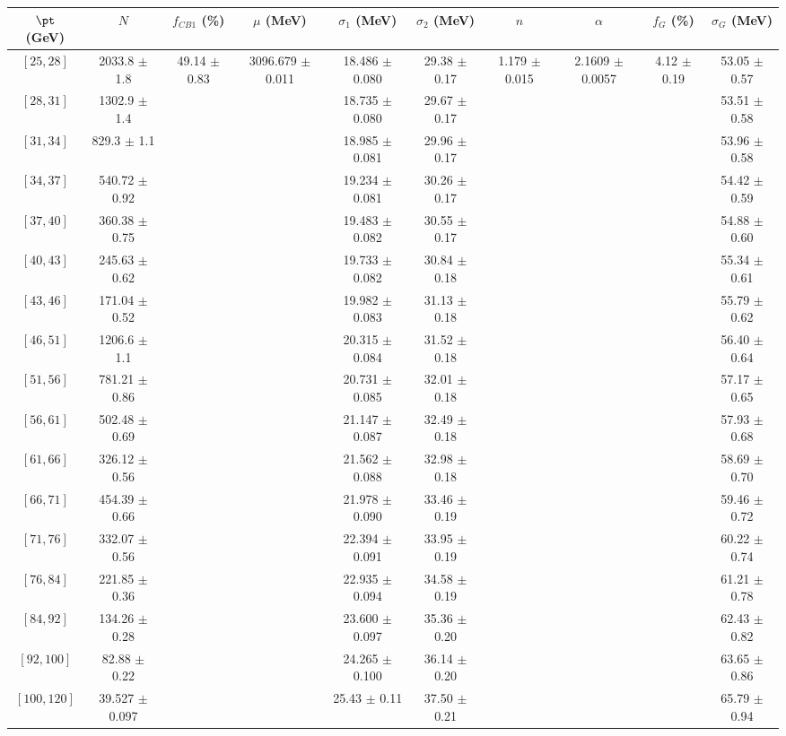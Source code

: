 \begin{tabular}{c||c|c|c|c|c|c|c|c|c}
$\pt$ (GeV) & $N$ & $f_{CB1}$ (\%)  & $\mu$ (MeV) & $\sigma_1$ (MeV) & $\sigma_2$ (MeV) & $n$ & $\alpha$ & $f_G$ (\%) & $\sigma_G$ (MeV) \\
\hline
$[25, 28]$ & 2033.8 $\pm$ 1.8 & \multirow{17}{*}{49.14 $\pm$ 0.83} & \multirow{17}{*}{3096.679 $\pm$ 0.011} & 18.486 $\pm$ 0.080 & 29.38 $\pm$ 0.17 & \multirow{17}{*}{1.179 $\pm$ 0.015} & \multirow{17}{*}{2.1609 $\pm$ 0.0057} & \multirow{17}{*}{4.12 $\pm$ 0.19} & 53.05 $\pm$ 0.57\\
$[28, 31]$ & 1302.9 $\pm$ 1.4 &  &  & 18.735 $\pm$ 0.080 & 29.67 $\pm$ 0.17 &  &  &  & 53.51 $\pm$ 0.58\\
$[31, 34]$ & 829.3 $\pm$ 1.1 &  &  & 18.985 $\pm$ 0.081 & 29.96 $\pm$ 0.17 &  &  &  & 53.96 $\pm$ 0.58\\
$[34, 37]$ & 540.72 $\pm$ 0.92 &  &  & 19.234 $\pm$ 0.081 & 30.26 $\pm$ 0.17 &  &  &  & 54.42 $\pm$ 0.59\\
$[37, 40]$ & 360.38 $\pm$ 0.75 &  &  & 19.483 $\pm$ 0.082 & 30.55 $\pm$ 0.17 &  &  &  & 54.88 $\pm$ 0.60\\
$[40, 43]$ & 245.63 $\pm$ 0.62 &  &  & 19.733 $\pm$ 0.082 & 30.84 $\pm$ 0.18 &  &  &  & 55.34 $\pm$ 0.61\\
$[43, 46]$ & 171.04 $\pm$ 0.52 &  &  & 19.982 $\pm$ 0.083 & 31.13 $\pm$ 0.18 &  &  &  & 55.79 $\pm$ 0.62\\
$[46, 51]$ & 1206.6 $\pm$ 1.1 &  &  & 20.315 $\pm$ 0.084 & 31.52 $\pm$ 0.18 &  &  &  & 56.40 $\pm$ 0.64\\
$[51, 56]$ & 781.21 $\pm$ 0.86 &  &  & 20.731 $\pm$ 0.085 & 32.01 $\pm$ 0.18 &  &  &  & 57.17 $\pm$ 0.65\\
$[56, 61]$ & 502.48 $\pm$ 0.69 &  &  & 21.147 $\pm$ 0.087 & 32.49 $\pm$ 0.18 &  &  &  & 57.93 $\pm$ 0.68\\
$[61, 66]$ & 326.12 $\pm$ 0.56 &  &  & 21.562 $\pm$ 0.088 & 32.98 $\pm$ 0.18 &  &  &  & 58.69 $\pm$ 0.70\\
$[66, 71]$ & 454.39 $\pm$ 0.66 &  &  & 21.978 $\pm$ 0.090 & 33.46 $\pm$ 0.19 &  &  &  & 59.46 $\pm$ 0.72\\
$[71, 76]$ & 332.07 $\pm$ 0.56 &  &  & 22.394 $\pm$ 0.091 & 33.95 $\pm$ 0.19 &  &  &  & 60.22 $\pm$ 0.74\\
$[76, 84]$ & 221.85 $\pm$ 0.36 &  &  & 22.935 $\pm$ 0.094 & 34.58 $\pm$ 0.19 &  &  &  & 61.21 $\pm$ 0.78\\
$[84, 92]$ & 134.26 $\pm$ 0.28 &  &  & 23.600 $\pm$ 0.097 & 35.36 $\pm$ 0.20 &  &  &  & 62.43 $\pm$ 0.82\\
$[92, 100]$ & 82.88 $\pm$ 0.22 &  &  & 24.265 $\pm$ 0.100 & 36.14 $\pm$ 0.20 &  &  &  & 63.65 $\pm$ 0.86\\
$[100, 120]$ & 39.527 $\pm$ 0.097 &  &  & 25.43 $\pm$ 0.11 & 37.50 $\pm$ 0.21 &  &  &  & 65.79 $\pm$ 0.94\\
\end{tabular}
